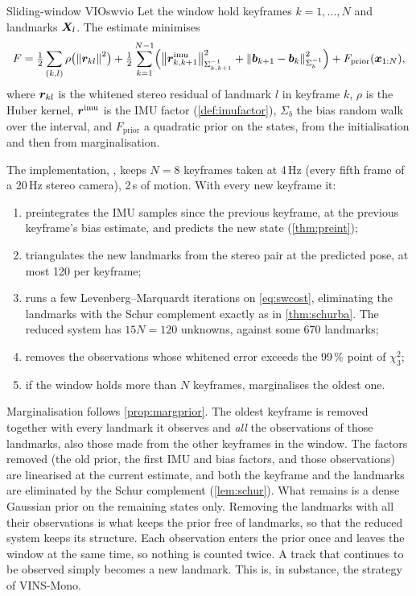 \begin{definition}{Sliding-window VIO}{swvio}
Let the window hold keyframes $k=1,\dots,N$ and landmarks $\bm{X}_l$.
The estimate minimises
\begin{equation}\label{eq:swcost}
F=\tfrac12\sum_{(k,l)}\rho\bigl(\left\lVert \bm{r}_{kl}\right\rVert^2\bigr)
+\tfrac12\sum_{k=1}^{N-1}\Bigl(\left\lVert \bm{r}^{\mathrm{imu}}_{k,k+1}\right\rVert^2_{
\Sigma_{k,k+1}^{-1}}+\left\lVert \bm{b}_{k+1}-\bm{b}_k\right\rVert^2_{\Sigma_b^{-1}}
\Bigr)+F_{\mathrm{prior}}(\bm{x}_{1:N}),
\end{equation}
where $\bm{r}_{kl}$ is the whitened stereo residual of landmark $l$ in
keyframe $k$, $\rho$ is the Huber kernel, $\bm{r}^{\mathrm{imu}}$ is the
IMU factor (\cref{def:imufactor}), $\Sigma_b$ the bias random walk over
the interval, and $F_{\mathrm{prior}}$ a quadratic prior on the states,
from the initialisation and then from marginalisation.
\end{definition}

The implementation, , keeps $N=8$ keyframes
taken at 4\,Hz (every fifth frame of a 20\,Hz stereo camera), 2\,s of
motion. With every new keyframe it:
\begin{enumerate}[nosep]
\item preintegrates the IMU samples since the previous keyframe, at the
  previous keyframe's bias estimate, and predicts the new state
  (\cref{thm:preint});
\item triangulates the new landmarks from the stereo pair at the
  predicted pose, at most 120 per keyframe;
\item runs a few Levenberg--Marquardt iterations on \eqref{eq:swcost},
  eliminating the landmarks with the Schur complement exactly as in
  \cref{thm:schurba}. The reduced system has $15N=120$ unknowns, against
  some 670 landmarks;
\item removes the observations whose whitened error exceeds the 99\,\%
  point of $\chi^2_3$;
\item if the window holds more than $N$ keyframes, marginalises the
  oldest one.
\end{enumerate}

Marginalisation follows \cref{prop:margprior}. The oldest keyframe is
removed together with every landmark it observes and \emph{all} the
observations of those landmarks, also those made from the other
keyframes in the window. The factors removed (the old prior, the first
IMU and bias factors, and those observations) are linearised at the
current estimate, and both the keyframe and the landmarks are eliminated
by the Schur complement (\cref{lem:schur}). What remains is a dense
Gaussian prior on the remaining states only. Removing the landmarks
with all their observations is what keeps the prior free of
landmarks, so that the reduced system keeps its structure. Each
observation enters the prior once and leaves the window at the same
time, so nothing is counted twice. A track that continues to be
observed simply becomes a new landmark. This is, in substance, the
strategy of VINS-Mono.

